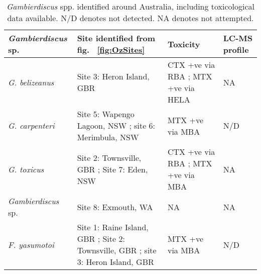 \documentclass[12pt]{article}
\begin{document}
\begin{table}
\caption{\emph{Gambierdiscus} spp. identified around Australia, including toxicological data available. N/D denotes not detected. NA denotes not attempted.}
\label{tbl:OzTable}
\begin{tabular}{ | p{3.3cm} | p{4cm} | p{4.5cm} | p{2.3cm} | }
\hline
 \textbf{\emph{Gambierdiscus} sp.} & \textbf{Site identified from fig. ~\ref{fig:OzSites}} & \textbf{Toxicity}  & \textbf{LC-MS profile}  \\
 \hline
 \emph{G. belizeanus}  & Site 3: Heron Island, GBR \citep{murray2014molecular} & CTX +ve via RBA \citep{chinain2010growth}; MTX +ve via HELA \citep{holland2013differences} & NA  \\
 \hline
 \emph{G. carpenteri} &Site 5: Wapengo Lagoon, NSW \citep{kohli2014high}; site 6:  Merimbula, NSW  \citep{kohli2014high}& MTX +ve via MBA \citep{kohli2014high} & N/D \citep{kohli2014high}\\
 \hline
 \emph{G. toxicus} & Site 2: Townsville, GBR \citep{hallegraeff2010algae}; Site 7: Eden, NSW \citep{hallegraeff2010algae} & CTX +ve via RBA \citep{chinain2010growth}; MTX +ve via MBA \citep{chinain1999morphology} & NA \\
  \hline
  \emph{Gambierdiscus} sp. & Site 8: Exmouth, WA \citep{kohli2014cob}& NA & NA \\
  \hline
 \emph{F. yasumotoi}  & Site 1: Raine Island, GBR \citep{murray2014molecular}; Site 2: Townsville, GBR \citep{murray2014molecular}; site 3: Heron Island, GBR \citep{murray2014molecular}& MTX +ve via MBA \citep{holmes1998gambierdiscus} & N/D \citep{rhodes2014gambierdiscus}\\
  \hline
\end{tabular}
\end{table}

\floatbarrier
\end{document}
